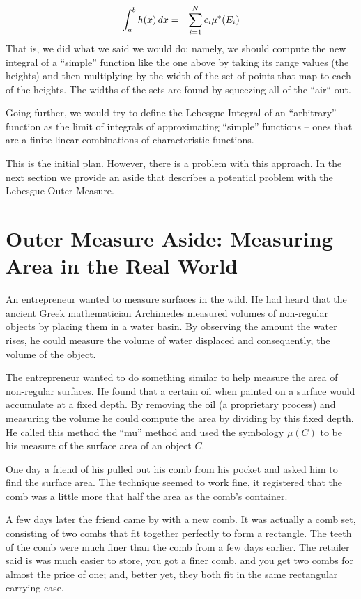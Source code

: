 \documentclass{article}
\begin{document}
\begin{eqnarray}
	\int_a^b h(x) \, dx & = & \sum_{i=1}^N\limits c_i \mu^*(E_i)
\end{eqnarray}
That is, we did what we said we would do; namely, we should compute the new integral 
of a ``simple'' function like the one above by taking its range values (the heights) 
and then multiplying by the width of the set of points that map to each of the heights. 
The widths of the sets are found by squeezing all of the ``air`` out.

Going further, we would try to define the Lebesgue Integral of an ``arbitrary''
function as the limit of integrals of approximating ``simple'' functions  -- ones that
are a finite linear combinations of characteristic functions.

This is the initial plan. However, there is a problem with this approach. In the next section we 
provide an aside that describes a potential problem with the Lebesgue Outer Measure.


\section{Outer Measure Aside: Measuring Area in the Real World}
An entrepreneur 
wanted to measure surfaces in the wild. He had heard that the 
ancient Greek mathematician Archimedes measured volumes of non-regular objects 
by placing them in a water basin. By observing the amount the water rises, he 
could measure the volume of water displaced and consequently, the volume of the object.

The entrepreneur wanted to do something similar to help measure the area of 
non-regular surfaces. He found that a 
certain oil when painted on a surface would accumulate at a fixed depth. By 
removing the oil (a proprietary process) and measuring the volume he could 
compute the area by dividing by this fixed depth. He called this method the 
``mu'' method and used the symbology $\mu(C)$ to be his measure of the surface 
area of an object $C$.

One day a friend of his pulled out his comb from his pocket and asked him to 
find the surface area. The technique seemed to work fine, it registered that 
the comb was a little more that half the area as the comb's container.

A few days later the friend came by with a new comb. It was actually a comb 
set, consisting of two combs that fit together perfectly to form a rectangle.
The teeth of the comb were much finer than the comb from a few days earlier. 
The retailer said is was much easier to store, you got a finer comb, and you 
get two combs for almost the price of one; and, better yet, they both 
fit in the same rectangular carrying case.
\end{document}
